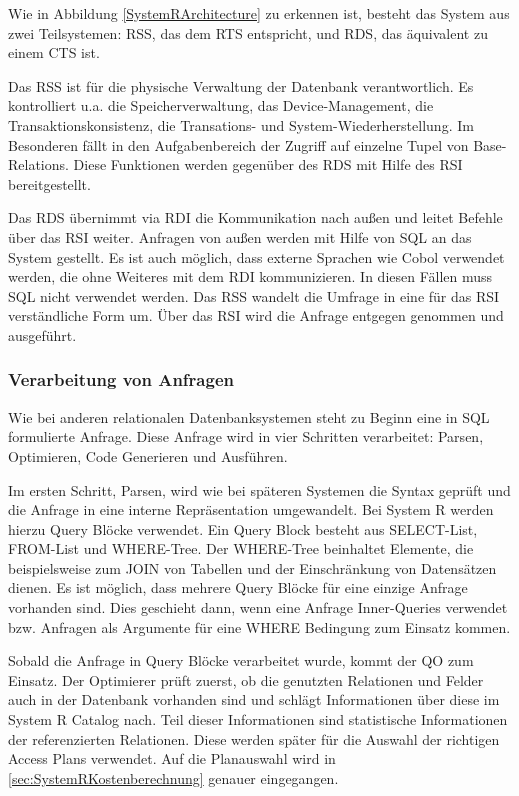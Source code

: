 Wie in Abbildung \ref{SystemRArchitecture} zu erkennen ist,  besteht das System aus zwei Teilsystemen: \ac{RSS}, das dem RTS entspricht, und \ac{RDS}, das äquivalent zu einem CTS ist.

Das \ac{RSS} ist für die physische Verwaltung der Datenbank verantwortlich. Es kontrolliert u.a. die Speicherverwaltung, das Device-Management, die Transaktionskonsistenz, die Transations- und System-Wiederherstellung. Im Besonderen fällt in den Aufgabenbereich der Zugriff auf einzelne Tupel von Base-Relations. Diese Funktionen werden gegenüber des \ac{RDS} mit Hilfe des \ac{RSI} bereitgestellt.

Das \ac{RDS} übernimmt via \ac{RDI} die Kommunikation nach außen und leitet Befehle über das \ac{RSI} weiter. Anfragen von außen werden mit Hilfe von \ac{SQL} an das System gestellt. Es ist auch möglich, dass externe Sprachen wie Cobol verwendet werden, die ohne Weiteres mit dem \ac{RDI} kommunizieren. In diesen Fällen muss SQL nicht verwendet werden. Das \ac{RSS} wandelt die Umfrage in eine für das \ac{RSI} verständliche Form um. Über das RSI wird die Anfrage entgegen genommen und ausgeführt.




\subsubsection{Verarbeitung von Anfragen}

Wie bei anderen relationalen Datenbanksystemen steht zu  Beginn eine in \ac{SQL} formulierte Anfrage. Diese Anfrage wird in vier Schritten verarbeitet: Parsen,  Optimieren, Code Generieren und Ausführen.

Im ersten Schritt, Parsen, wird wie bei späteren Systemen die Syntax geprüft und die Anfrage in eine interne Repräsentation umgewandelt. Bei System R werden hierzu Query Blöcke verwendet. Ein Query Block besteht aus SELECT-List, FROM-List und WHERE-Tree. Der WHERE-Tree beinhaltet Elemente, die beispielsweise zum JOIN von Tabellen und der Einschränkung von Datensätzen dienen. Es ist möglich, dass mehrere Query Blöcke für eine einzige Anfrage vorhanden sind. Dies geschieht dann, wenn eine Anfrage Inner-Queries verwendet bzw. Anfragen als Argumente für eine WHERE Bedingung zum Einsatz kommen.


Sobald die Anfrage in Query Blöcke verarbeitet wurde, kommt der \ac{QO} zum Einsatz. Der Optimierer prüft zuerst, ob die genutzten Relationen und Felder auch in der Datenbank vorhanden sind und schlägt Informationen über diese im System R Catalog nach. Teil dieser Informationen sind statistische Informationen der referenzierten Relationen. Diese werden später für die Auswahl der richtigen Access Plans verwendet. Auf die Planauswahl wird in \ref{sec:SystemRKostenberechnung} genauer eingegangen.

